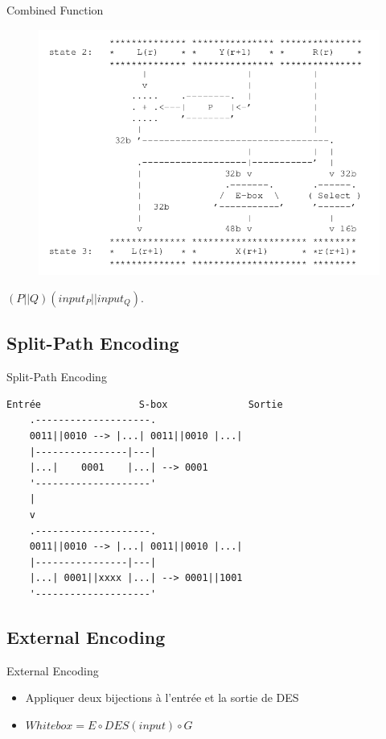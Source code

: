 \documentclass{beamer}
\begin{document}
\begin{frame}{Combined Function}
  \begin{figure}[h]
    \centering
    \includegraphics[scale=0.4]{./images/etape2.png}
  \end{figure}
  \begin{center}
    $(P||Q)(input_P||input_Q)$.
  \end{center}
\end{frame}

\subsection{Split-Path Encoding}

\begin{frame}[fragile]{Split-Path Encoding}
  \begin{Verbatim}[samepage=true]
    Entrée                 S-box              Sortie
    .--------------------.
    0011||0010 --> |...| 0011||0010 |...|
    |----------------|---|
    |...|    0001    |...| --> 0001
    '--------------------'
    | 
    v
    .--------------------.
    0011||0010 --> |...| 0011||0010 |...|
    |----------------|---|
    |...| 0001||xxxx |...| --> 0001||1001
    '--------------------'
  \end{Verbatim}
  
\end{frame}

\subsection{External Encoding}

\begin{frame}{External Encoding}

  \begin{center}
    \begin{itemize}
    \item Appliquer deux bijections à l'entrée et la sortie de DES
    \item $Whitebox = E \circ DES(input) \circ G$
    \end{itemize}
  \end{center}

\end{frame}
\end{document}
